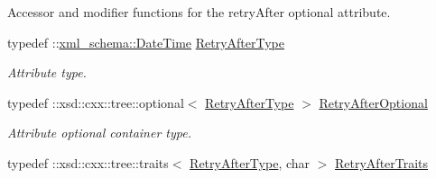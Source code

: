 Accessor and modifier functions for the retryAfter optional attribute. \begin{DoxyCompactItemize}
\item 
\hypertarget{classopenstack_1_1xml_1_1OverLimitAPIFault_a6cb6485a20a69f6af02b43e708d56053}{
typedef ::\hyperlink{namespacexml__schema_ac157d7debe19af40c06ef2330429a088}{xml\_\-schema::DateTime} \hyperlink{classopenstack_1_1xml_1_1OverLimitAPIFault_a6cb6485a20a69f6af02b43e708d56053}{RetryAfterType}}
\label{classopenstack_1_1xml_1_1OverLimitAPIFault_a6cb6485a20a69f6af02b43e708d56053}

\begin{DoxyCompactList}\small\item\em Attribute type. \item\end{DoxyCompactList}\item 
\hypertarget{classopenstack_1_1xml_1_1OverLimitAPIFault_a734c2f2998f73b722135849bebd65dd1}{
typedef ::xsd::cxx::tree::optional$<$ \hyperlink{classopenstack_1_1xml_1_1OverLimitAPIFault_a6cb6485a20a69f6af02b43e708d56053}{RetryAfterType} $>$ \hyperlink{classopenstack_1_1xml_1_1OverLimitAPIFault_a734c2f2998f73b722135849bebd65dd1}{RetryAfterOptional}}
\label{classopenstack_1_1xml_1_1OverLimitAPIFault_a734c2f2998f73b722135849bebd65dd1}

\begin{DoxyCompactList}\small\item\em Attribute optional container type. \item\end{DoxyCompactList}\item 
\hypertarget{classopenstack_1_1xml_1_1OverLimitAPIFault_a858083ea5b76f491e685f54619cf06a1}{
typedef ::xsd::cxx::tree::traits$<$ \hyperlink{classopenstack_1_1xml_1_1OverLimitAPIFault_a6cb6485a20a69f6af02b43e708d56053}{RetryAfterType}, char $>$ \hyperlink{classopenstack_1_1xml_1_1OverLimitAPIFault_a858083ea5b76f491e685f54619cf06a1}{RetryAfterTraits}}
\label{classopenstack_1_1xml_1_1OverLimitAPIFault_a858083ea5b76f491e685f54619cf06a1}


\end{DoxyCompactItemize}

